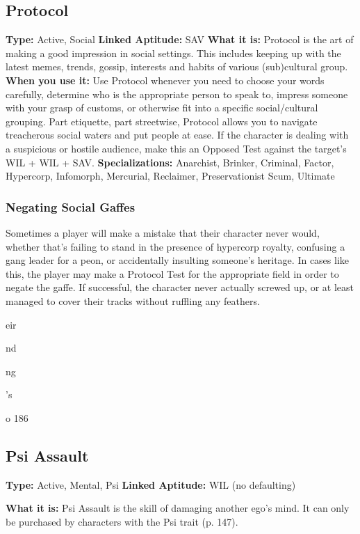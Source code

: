 \subsection{Protocol}

\textbf{Type:} Active, Social
\textbf{Linked Aptitude:} SAV
\textbf{What it is:} Protocol is the art of making a good 
impression in social settings. This includes keeping 
up with the latest memes, trends, gossip, interests and 
habits of various (sub)cultural group.
\textbf{When you use it:} Use Protocol whenever you need 
to choose your words carefully, determine who is the 
appropriate person to speak to, impress someone with 
your grasp of customs, or otherwise fit into a specific 
social/cultural grouping. Part etiquette, part streetwise, 
Protocol allows you to navigate treacherous social 
waters and put people at ease. If the character is dealing
with a suspicious or hostile audience, make this an
Opposed Test against the target's WIL + WIL + SAV.
\textbf{Specializations:} Anarchist, Brinker, Criminal, Factor, 
Hypercorp, Infomorph, Mercurial, Reclaimer, Preservationist
Scum, Ultimate

\subsubsection{Negating Social Gaffes}

Sometimes a player will make a mistake that their 
character never would, whether that's failing to stand 
in the presence of hypercorp royalty, confusing a gang 
leader for a peon, or accidentally insulting someone's 
heritage. In cases like this, the player may make a Protocol
Test for the appropriate field in order to negate
the gaffe. If successful, the character never actually 
screwed up, or at least managed to cover their tracks 
without ruffling any feathers.

eir

nd

ng

's

o
186

\subsection{Psi Assault}

\textbf{Type:} Active, Mental, Psi
\textbf{Linked Aptitude:} WIL (no defaulting)

\textbf{What it is:} Psi Assault is the skill of damaging another
ego's mind. It can only be purchased by characters
with the Psi trait (p. 147).

